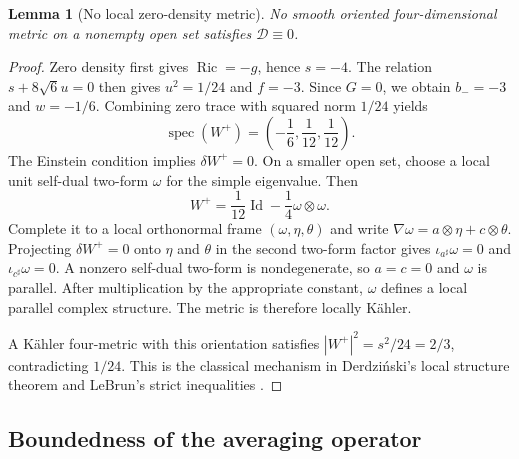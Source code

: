 \documentclass[a4paper,11pt]{article}
\theoremstyle{paper}
\newtheorem{lemma}[theorem]{Lemma}
\DeclareMathOperator{\Ric}{Ric}
\DeclareMathOperator{\Id}{Id}
\newcommand{\Dcal}{\mathcal D}
\numberwithin{equation}{section}
\begin{document}
\begin{lemma}[No local zero-density metric]\label{lem:forbidden}
No smooth oriented four-dimensional metric on a nonempty open set satisfies $\Dcal\equiv0$.
\end{lemma}
\begin{proof}
Zero density first gives $\Ric=-g$, hence $s=-4$. The relation $s+8\sqrt6u=0$ then gives $u^2=1/24$ and $f=-3$. Since $G=0$, we obtain $b_-=-3$ and $w=-1/6$. Combining zero trace with squared norm $1/24$ yields
\begin{equation}\label{eq:forbidden-spectrum}
\operatorname{spec}(W^+)=\left(-\frac16,\frac1{12},\frac1{12}\right).
\end{equation}
The Einstein condition implies $\delta W^+=0$. On a smaller open set, choose a local unit self-dual two-form $\omega$ for the simple eigenvalue. Then
\[
W^+=\frac1{12}\Id-\frac14\omega\otimes\omega.
\]
Complete it to a local orthonormal frame $(\omega,\eta,\theta)$ and write $\nabla\omega=a\otimes\eta+c\otimes\theta$. Projecting $\delta W^+=0$ onto $\eta$ and $\theta$ in the second two-form factor gives $\iota_{a^\sharp}\omega=0$ and $\iota_{c^\sharp}\omega=0$. A nonzero self-dual two-form is nondegenerate, so $a=c=0$ and $\omega$ is parallel. After multiplication by the appropriate constant, $\omega$ defines a local parallel complex structure. The metric is therefore locally K\"ahler.

A K\"ahler four-metric with this orientation satisfies $|W^+|^2=s^2/24=2/3$, contradicting $1/24$. This is the classical mechanism in Derdzi\'nski's local structure theorem and LeBrun's strict inequalities \cite{derd,lebrun2004}.
\end{proof}

\subsection{Boundedness of the averaging operator}
\end{document}

